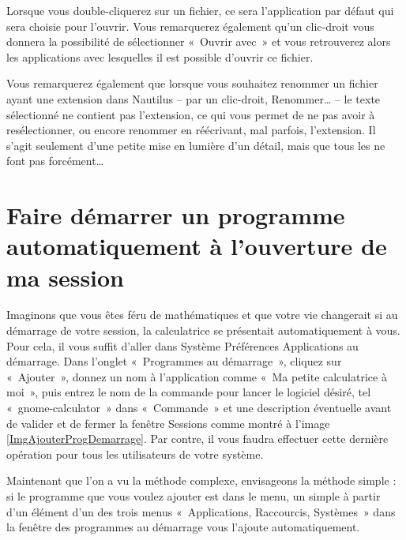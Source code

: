 Lorsque vous double-cliquerez sur un fichier, ce sera l'application par défaut qui sera choisie pour l'ouvrir. Vous remarquerez également qu'un clic-droit vous donnera la possibilité de sélectionner «~Ouvrir avec~» et vous retrouverez alors les applications avec lesquelles il est possible d'ouvrir ce fichier.\par
\begin{nota}
Vous remarquerez également que lorsque vous souhaitez renommer un fichier ayant une extension dans Nautilus -- par un clic-droit, Renommer\ldots{} -- le texte sélectionné ne contient pas l'extension, ce qui vous permet de ne pas avoir à resélectionner, ou encore renommer en réécrivant, mal parfois, l'extension. Il s'agit seulement d'une petite mise en lumière d'un détail, mais que tous les  ne font pas forcément\ldots{}
\end{nota}
\section{Faire démarrer un programme automatiquement à l'ouverture de ma session}
Imaginons que vous êtes féru de mathématiques et que votre vie changerait si au démarrage de votre session, la calculatrice se présentait automatiquement à vous. Pour cela, il vous suffit d'aller dans Système \FlecheDroite Préférences \FlecheDroite Applications au démarrage. Dans l'onglet «~Programmes au démarrage~», cliquez sur «~Ajouter~», donnez un nom à l'application comme «~Ma petite calculatrice à moi~», puis entrez le nom de la commande pour lancer le logiciel désiré, tel «~gnome-calculator~» dans «~Commande~» et une description éventuelle avant de valider et de fermer la fenêtre Sessions comme montré à l'image \ref{ImgAjouterProgDemarrage}. Par contre, il vous faudra effectuer cette dernière opération pour tous les utilisateurs de votre système.\par
{}
Maintenant que l'on a vu la méthode complexe, envisageons la méthode simple : si le programme que vous voulez ajouter est dans le menu, un simple  à partir d'un élément d'un des trois menus «~Applications, Raccourcis, Systèmes~» dans la fenêtre des programmes au démarrage vous l'ajoute automatiquement.
